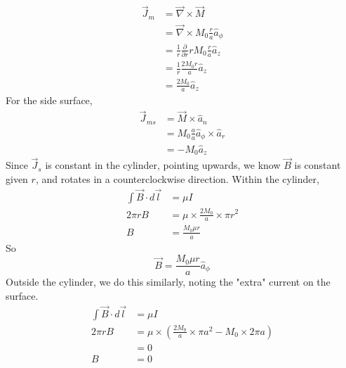 \documentclass[answers]{exam}
\begin{document}
\begin{questions}
\begin{solution}
    \begin{align*}
        \vec J_m &= \vec\nabla \times \vec M \\
                 &= \vec\nabla \times M_0\frac{r}{a} \hat a_\phi \\
                 &= \frac{1}{r} \frac{\partial}{\partial r} rM_0\frac{r}{a} \hat a_z \\
                 &= \frac{1}{r} \frac{2M_0r}{a} \hat a_z \\
                 &= \frac{2M_0}{a} \hat a_z
    \end{align*}
    For the side surface,
    \begin{align*}
        \vec J_{ms} &= \vec M \times \hat a_n \\
                    &= M_0\frac{a}{a} \hat a_\phi \times \hat a_r \\
                    &= -M_0 \hat a_z
    \end{align*}
    Since $\vec J_s$ is constant in the cylinder, pointing upwards, we know $\vec B$ is constant given $r$, and rotates in a counterclockwise direction. Within the cylinder,
    \begin{align*}
        \int \vec B \cdot d\vec l &= \mu I \\
        2\pi rB &= \mu \times \frac{2M_0}{a} \times \pi r^2 \\
        B &= \frac{M_0\mu r}{a}
    \end{align*}
    So
    $$\vec B = \frac{M_0\mu r}{a} \hat a_\phi$$
    Outside the cylinder, we do this similarly, noting the "extra" current on the surface.
    \begin{align*}
        \int \vec B \cdot d\vec l &= \mu I \\
        2\pi rB &= \mu \times \left(\frac{2M_0}{a} \times \pi a^2 - M_0\times 2\pi a\right) \\
                &= 0 \\
        B &= 0
    \end{align*}
\end{solution}




\end{questions}
\end{document}
